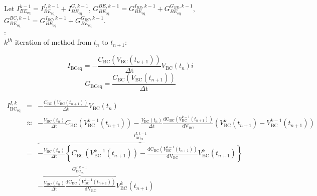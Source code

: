 \documentclass{article}
\begin{document}
Let $I_{BE_{\text{eq}}}^{k-1}=I_{BE_{\text{eq}}}^{I,k-1}+I_{BE_{\text{eq}}}^{G,k-1}$,
$G_{BE_{\text{eq}}}^{BE,k-1}=G_{BE_{\text{eq}}}^{I_{BE},k-1}+G_{BE_{\text{eq}}}^{G_{BE},k-1}$,
$G_{BE_{\text{eq}}}^{BC,k-1}=G_{BE_{\text{eq}}}^{I_{BC},k-1}+G_{BE_{\text{eq}}}^{G_{BC},k-1}$.\\

:\\
$k^{th}$ iteration of \NR method from $t_n$ to $t_{n+1}$:

\begin{equation*}
  I_{\text{BCeq}}=-\frac{C_{\text{BC}}\left(V_{\text{BC}}\left(t_{n+1}\right)\right)}{\text{$\Delta $t}}V_{\text{BC}}\left(t_n\right)i
\end{equation*}
\begin{equation*}
  G_{\text{BCeq}}=\frac{C_{\text{BC}}\left(V_{\text{BC}}\left(t_{n+1}\right)\right)}{\text{$\Delta $t}}
\end{equation*}

\begin{eqnarray*}
I_{\text{BC}_{\text{eq}}}^{I,k}&=&-\frac{C_{\text{BC}}\left(V_{\text{BC}}\left(t_{n+1}\right)\right)}{\text{$\Delta $t}}V_{\text{BC}}\left(t_n\right)
\\&\approx&
-\frac{V_{\text{BC}}\left(t_n\right)}{\text{$\Delta $t}}C_{\text{BC}}\left(V_{\text{BC}}^{k-1}\left(t_{n+1}\right)\right)-\frac{V_{\text{BC}}\left(t_n\right)}{\text{$\Delta $t}}\frac{\text{dC}_{\text{BC}}\left(V_{\text{BC}}^{k-1}\left(t_{n+1}\right)\right)}{\text{dV}_{\text{BC}}}\left(V_{\text{BC}}^k\left(t_{n+1}\right)-V_{\text{BC}}^{k-1}\left(t_{n+1}\right)\right)
\\&=&
\overbrace{-\frac{V_{\text{BC}}\left(t_n\right)}{\text{$\Delta $t}}\left\{C_{\text{BC}}\left(V_{\text{BC}}^{k-1}\left(t_{n+1}\right)\right)-\frac{\text{dC}_{\text{BC}}\left(V_{\text{BC}}^{k-1}\left(t_{n+1}\right)\right)}{\text{dV}_{\text{BC}}}V_{\text{BC}}^k\left(t_{n+1}\right)\right\}}^{I_{\text{BC}_{\text{eq}}}^{I,k-1}}
\\&&
-\overbrace{\frac{V_{\text{BC}}\left(t_n\right)}{\text{$\Delta $t}}\frac{\text{dC}_{\text{BC}}\left(V_{\text{BC}}^{k-1}\left(t_{n+1}\right)\right)}{\text{dV}_{\text{BC}}}}^{G_{\text{BC}_{\text{eq}}}^{I,k-1}}V_{\text{BC}}^k\left(t_{n+1}\right)
\end{eqnarray*}
\end{document}
